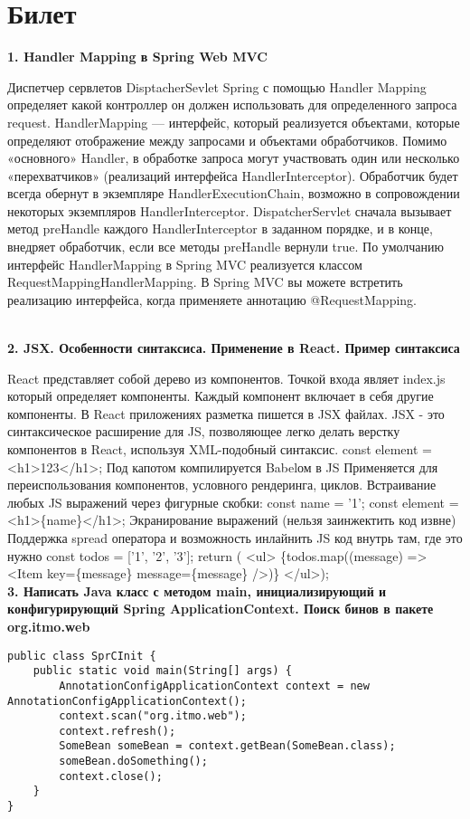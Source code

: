 \documentclass{article}
\newcommand{\bil}[5]{%
        \section{Билет}
        \textbf{1. #1}

        #4
        \\
        \textbf{2. #2}
        
        #5
        \\
        \textbf{3. #3}
}
\begin{document}
\bil{Handler Mapping в Spring Web MVC}{JSX. Особенности синтаксиса. Применение в React. Пример синтаксиса}
{Написать Java класс с методом main, инициализирующий и конфигурирующий Spring ApplicationContext. Поиск бинов в пакете org.itmo.web}{
    Диспетчер сервлетов DisptacherSevlet Spring с помощью Handler Mapping определяет какой контроллер он должен использовать для определенного запроса request.
    HandlerMapping — интерфейс, который реализуется объектами, которые определяют отображение между запросами и объектами обработчиков.
    Помимо «основного» Handler, в обработке запроса могут участвовать один или несколько «перехватчиков» (реализаций интерфейса HandlerInterceptor). 
    Обработчик будет всегда обернут в экземпляре HandlerExecutionChain, возможно в сопровождении некоторых экземпляров HandlerInterceptor. 
    DispatcherServlet сначала вызывает метод preHandle каждого HandlerInterceptor в заданном порядке, и в конце, внедряет обработчик, если все методы preHandle вернули true.
    По умолчанию интерфейс HandlerMapping в Spring MVC реализуется классом RequestMappingHandlerMapping.
    В Spring MVC вы можете встретить реализацию интерфейса, когда применяете аннотацию @RequestMapping. 
}{
    React представляет собой дерево из компонентов. Точкой входа являет index.js который определяет компоненты. 
    Каждый компонент включает в себя другие компоненты. 
    В React приложениях разметка пишется в JSX файлах.
    JSX - это синтаксическое расширение для JS, позволяющее легко делать верстку компонентов в React, используя XML-подобный синтаксис.
    const element = <h1>123</h1>;
    Под капотом компилируется Babelом в JS
    Применяется для переиспользования компонентов, условного рендеринга, циклов.
    Встраивание любых JS выражений через фигурные скобки:
    const name = '1';
    const element = <h1>\{name\}</h1>;
    Экранирование выражений (нельзя заинжектить код извне)
    Поддержка spread оператора и возможность инлайнить JS код внутрь там, где это нужно
    const todos = ['1', '2', '3'];
    return (
        <ul>
            \{todos.map((message) => <Item key=\{message\} message=\{message\} />)\}
        </ul>);}
\begin{lstlisting}[frame=single, basicstyle=\ttfamily, breaklines=true, breakatwhitespace=true, postbreak=\mbox{\textcolor{red}{$\hookrightarrow$}\space}]
    public class SprCInit {
    public static void main(String[] args) {
        AnnotationConfigApplicationContext context = new AnnotationConfigApplicationContext();
        context.scan("org.itmo.web");
        context.refresh();
        SomeBean someBean = context.getBean(SomeBean.class);
        someBean.doSomething();
        context.close();
    }
}
\end{lstlisting}
\end{document}
